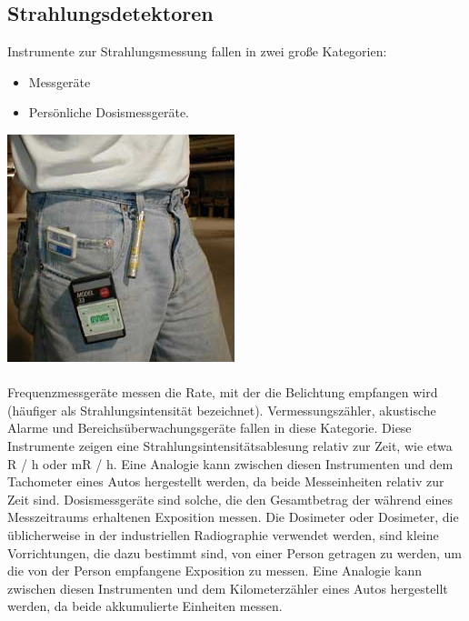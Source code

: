 {\subsection{Strahlungsdetektoren}
Instrumente zur Strahlungsmessung fallen in zwei große Kategorien:
\begin{itemize}
\item Messgeräte 
\item Persönliche Dosismessgeräte. 
\end{itemize}
\includegraphics[scale=0.5]{img/strahlungsdetektor.jpg}\\
\\
Frequenzmessgeräte messen die Rate, mit der die Belichtung empfangen wird 
(häufiger als Strahlungsintensität bezeichnet).
Vermessungszähler, akustische Alarme und Bereichsüberwachungsgeräte fallen in diese Kategorie. Diese Instrumente zeigen eine Strahlungsintensitätsablesung relativ zur Zeit, wie etwa R / h oder mR / h. Eine Analogie kann zwischen diesen Instrumenten und dem Tachometer eines Autos hergestellt werden, da beide Messeinheiten relativ zur Zeit sind.
Dosismessgeräte sind solche, die den Gesamtbetrag der während eines Messzeitraums erhaltenen Exposition messen. Die Dosimeter oder Dosimeter, die üblicherweise in der industriellen Radiographie verwendet werden, sind kleine Vorrichtungen, die dazu bestimmt sind, von einer Person getragen zu werden, um die von der Person empfangene Exposition zu messen. Eine Analogie kann zwischen diesen Instrumenten und dem Kilometerzähler eines Autos hergestellt werden, da beide akkumulierte Einheiten messen.

}

